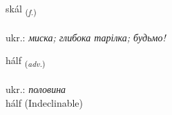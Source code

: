 \documentclass[frontgrid, backgrid]{flacards}\usepackage[]{graphicx}\usepackage[]{xcolor}
\begin{document}
\renewcommand{\flhead}{\vskip5pt \fboxsep=0pt {\small\bfseries\footnotesize Nafnorð | іменник}}
\renewcommand{\fcfoot}{\vskip5pt \fboxsep=0pt \hspace{2pt}{\small\bfseries\footnotesize 3K}}

\renewcommand{\blhead}{\vskip5pt {\small\bfseries\footnotesize Nafnorð | іменник }}
\renewcommand{\bcfoot}{\vskip5pt \hspace{2pt}{\small\bfseries\footnotesize 3K}}


{skál \small{\textsubscript{(\textit{f.})}} \\[1ex] %
\textphonetic{[skauːl]} \\
ukr.: \emph{миска; глибока тарілка; будьмо!} \\  [2ex]
\renewcommand*{\arraystretch}{0.8}
}


\renewcommand{\flhead}{\vskip5pt \fboxsep=0pt {\small\bfseries\footnotesize Atviksorð | прислівник}}
\renewcommand{\fcfoot}{\vskip5pt \fboxsep=0pt \hspace{2pt}{\small\bfseries\footnotesize 3K}}

\renewcommand{\blhead}{\vskip5pt {\small\bfseries\footnotesize Atviksorð | прислівник }}
\renewcommand{\bcfoot}{\vskip5pt \hspace{2pt}{\small\bfseries\footnotesize 3K}}


{hálf \small{\textsubscript{(\textit{adv.})}} \\[1ex]
\textphonetic{[haulv]} \\
ukr.: \emph{половина} \\  [2ex]
hálf (Indeclinable)}

\renewcommand{\flhead}{\vskip5pt \fboxsep=0pt {\small\bfseries\footnotesize Sagnorð | дієслово}}
\renewcommand{\fcfoot}{\vskip5pt \fboxsep=0pt \hspace{2pt}{\small\bfseries\footnotesize 3K}}
\end{document}
